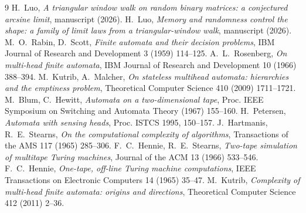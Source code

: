 \documentclass[11pt]{article}
\begin{document}

\begin{thebibliography}{9}
 H.~Luo, \emph{A triangular window walk on random binary matrices: a
conjectured arcsine limit}, manuscript (2026).
 H.~Luo, \emph{Memory and randomness control the shape: a family of
limit laws from a triangular-window walk}, manuscript (2026).
 M.~O.~Rabin, D.~Scott, \emph{Finite automata and their
decision problems}, IBM Journal of Research and Development 3 (1959) 114--125.
 A.~L.~Rosenberg, \emph{On multi-head finite automata}, IBM
Journal of Research and Development 10 (1966) 388--394.
 M.~Kutrib, A.~Malcher, \emph{On stateless
multihead automata: hierarchies and the emptiness problem}, Theoretical Computer Science 410 (2009)
1711--1721.
 M.~Blum, C.~Hewitt, \emph{Automata on a two-dimensional
tape}, Proc. IEEE Symposium on Switching and Automata Theory (1967) 155--160.
 H.~Petersen, \emph{Automata with sensing heads}, Proc. ISTCS
1995, 150--157.
 J.~Hartmanis, R.~E.~Stearns, \emph{On the
computational complexity of algorithms}, Transactions of the AMS 117 (1965) 285--306.
 F.~C.~Hennie, R.~E.~Stearns, \emph{Two-tape simulation
of multitape Turing machines}, Journal of the ACM 13 (1966) 533--546.
 F.~C.~Hennie, \emph{One-tape, off-line Turing machine computations},
IEEE Transactions on Electronic Computers 14 (1965) 35--47.
 M.~Kutrib, \emph{Complexity of multi-head finite automata: origins and
directions}, Theoretical Computer Science 412 (2011) 2--36.
\end{thebibliography}
\end{document}
